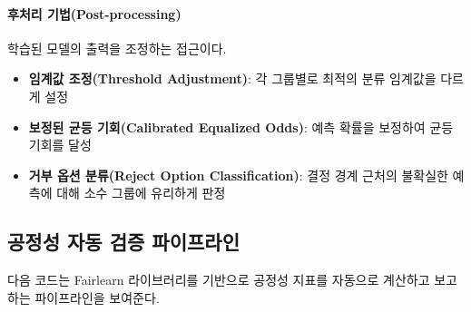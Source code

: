 \paragraph{후처리 기법(Post-processing)}
학습된 모델의 출력을 조정하는 접근이다.
\begin{itemize}
  \item \textbf{임계값 조정(Threshold Adjustment)}: 각 그룹별로 최적의 분류 임계값을 다르게 설정
  \item \textbf{보정된 균등 기회(Calibrated Equalized Odds)}: 예측 확률을 보정하여 균등 기회를 달성
  \item \textbf{거부 옵션 분류(Reject Option Classification)}: 결정 경계 근처의 불확실한 예측에 대해 소수 그룹에 유리하게 판정
\end{itemize}

\subsection{공정성 자동 검증 파이프라인}
\label{sec:10.3.4}

다음 코드는 Fairlearn 라이브러리를 기반으로 공정성 지표를 자동으로 계산하고 보고하는 파이프라인을 보여준다.

